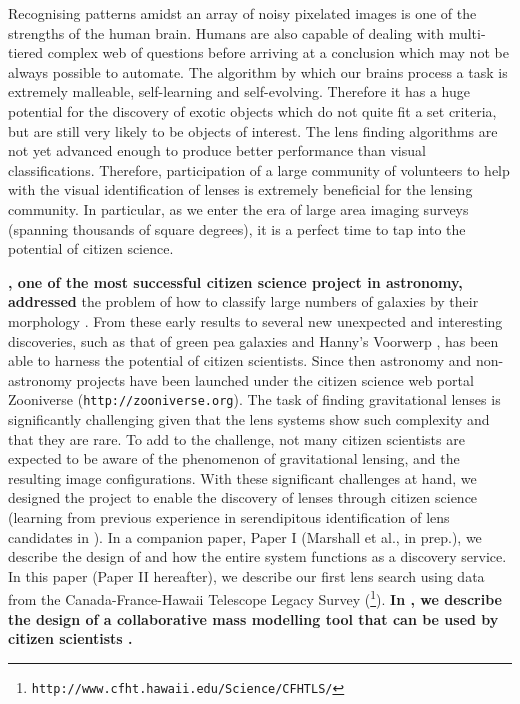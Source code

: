 \documentclass[useAMS,usenatbib,a4paper]{mn2e}
\begin{document}
Recognising patterns amidst an array of noisy pixelated images is one of the
strengths of the human brain. Humans are also capable of dealing with
multi-tiered complex web of questions before arriving at a conclusion which may
not be always possible to automate. The algorithm by which our brains process a
task is extremely malleable, self-learning and self-evolving. Therefore it has
a huge potential for the discovery of exotic objects which do not quite fit a
set criteria, but are still very likely to be objects of interest. The lens
finding algorithms are not yet advanced enough to produce better performance
than visual classifications. Therefore, participation of a large community of
volunteers to help with the visual identification of lenses is extremely
beneficial for the lensing community. In particular, as we enter the era of
large area imaging surveys (spanning thousands of square degrees), it is
a perfect time to tap into the potential of citizen science.

{\bf \GZ, one of the most successful citizen science project in
astronomy, addressed}
the problem of how to  classify large numbers of galaxies by their
morphology \citep{Lintott2008}.  From these early results to several new unexpected and
interesting discoveries, such as that of green pea galaxies
\citep{Cardamone2009,Jaskot2013} and Hanny's Voorwerp
\citep{Lintott2009,Keel2012}, \GZ has been able to harness the potential
of citizen scientists.  Since then astronomy and non-astronomy projects
have been launched under the citizen science web portal Zooniverse
(\texttt{http://zooniverse.org}). The task of finding gravitational lenses is
significantly challenging given that the lens systems show such
complexity and that they are rare. To add to the challenge, not many
citizen scientists are expected to be aware of the phenomenon of
gravitational lensing, and the resulting image configurations.  With
these significant challenges at hand, we designed the \sw project to
enable the discovery of lenses through citizen science (learning from
previous experience in serendipitous identification of lens candidates in \GZ).  In a companion
paper, Paper I (Marshall et al., in prep.), we describe the design of
\sw and how the entire system functions as a discovery service.  In this
paper (Paper II hereafter), we describe our first lens search using data
from the Canada-France-Hawaii Telescope Legacy Survey
(\cfhtls\footnote{\texttt{http://www.cfht.hawaii.edu/Science/CFHTLS/}}).
{\bf In \citet{Kung2015}, we describe the design of a collaborative
mass modelling tool that can be used by citizen scientists
.}
\end{document}
